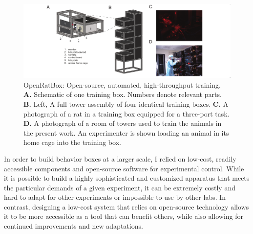 \begin{figure}[t!]
    \includegraphics[width=\textwidth]{figures/chapter_1/fig_1-1_openratbox/fig_1-1_openratbox_compressed.pdf}
    \vspace{.1in}
    \caption[OpenRatBox]{OpenRatBox: Open-source, automated, high-throughput training. \textbf{A.} Schematic of one training box. Numbers denote relevant parts. 
    \textbf{B.} Left, A full tower assembly of four identical training boxes. \textbf{C.} A photograph of a rat in a training box equipped for a three-port task. \textbf{D.} A photograph of a room of towers used to train the animals in the present work. An experimenter is shown loading an animal in its home cage into the training box.  
    \label{fig:openratbox}}
\end{figure}

In order to build behavior boxes at a larger scale, I relied on low-cost, readily accessible components and open-source software for experimental control. While it is possible to build a highly sophisticated and customized apparatus that meets the particular demands of a given experiment, it can be extremely costly and hard to adapt for other experiments or impossible to use by other labs. In contrast, designing a low-cost system that relies on open-source technology allows it to be more accessible as a tool that can benefit others, while also allowing for continued improvements and new adaptations. 

